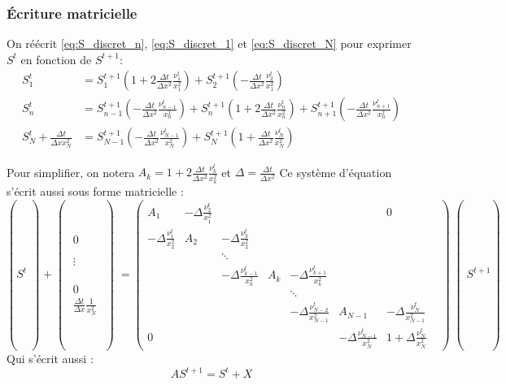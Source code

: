 \subsubsection{Écriture matricielle}
On réécrit \eqref{eq:S_discret_n}, \eqref{eq:S_discret_1} et \eqref{eq:S_discret_N} pour exprimer $S^t$ en fonction de $S^{t+1}$:
\begin{align}
  S^{t}_1 & = S_1^{t+1}\left(1 + 2\frac{\Delta t}{\Delta x^2}\frac{\nu_1^t}{x_1^2}\right)
  + S_{2}^{t+1}\left(-\frac{\Delta t}{\Delta x^2}\frac{\nu_{2}^t}{x_1^2}\right)\\
  S^{t}_n & = S_{n-1}^{t+1}\left(-\frac{\Delta t}{\Delta x^2}\frac{\nu_{n-1}^t}{x_n^2}\right)
  + S_n^{t+1}\left(1 + 2\frac{\Delta t}{\Delta x^2}\frac{\nu_n^t}{x_n^2}\right)
  + S_{n+1}^{t+1}\left(-\frac{\Delta t}{\Delta x^2}\frac{\nu_{n+1}^t}{x_n^2}\right)\\
  S^{t}_N + \frac{\Delta t}{\Delta x x_N^2}& = S^{t+1}_{N-1} \left(-\frac{\Delta t}{\Delta x^2}\frac{\nu_{N-1}^t}{x_N^2}\right) + S_N^{t+1} \left(1 + \frac{\Delta t}{\Delta x^2}\frac{\nu^t_N}{x_N^2}\right)
\end{align}

Pour simplifier, on notera $A_k = 1 + 2 \frac{\Delta t}{\Delta x^2}\frac{\nu_k^t}{x_k^2}$ et $\Delta = \frac{\Delta t}{\Delta x^2}$
Ce système d'équation s'écrit aussi sous forme matricielle :
\begin{equation}
  \left(S^t\middle) + 
  \middle(\begin{matrix}
    0 \\
    \\
    \\
    \vdots \\
    \\
    \\
    \\
    0 \\
    \frac{\Delta t}{\Delta x}\frac{1}{x_N^2}
  \end{matrix}\middle)
  =
  \begin{pmatrix}
A_1                            & -\Delta\frac{\nu_{2}^t}{x_1^2} &  & & & & 0\\
-\Delta \frac{\nu_{1}^t}{x_2^2} & A_2                           & -\Delta\frac{\nu_{3}^t}{x_2^2} & & & &\\
    &        & \ddots                          &  & & & &\\
    &        & -\Delta \frac{\nu_{k-1}^t}{x_k^2} & A_k    & -\Delta \frac{\nu_{k+1}^t}{x_k^2} & &\\
    &        &                                 & & \ddots                          & & \\
    & & & & -\Delta \frac{\nu_{N-2}^t}{x_{N-1}^2} & A_{N-1} & -\Delta \frac{\nu_{N}^t}{x_{N-1}^2}\\
    0 & & & & & -\Delta \frac{\nu_{N-1}^t}{x_N^2} & 1 + \Delta \frac{\nu_N^t}{x_N^2}
  \end{pmatrix} \middle(S^{t+1}\right)
\end{equation}
Qui s'écrit aussi :
\begin{equation}
  AS^{t+1} = S^t + X 
\end{equation}

